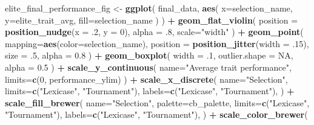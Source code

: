 \documentclass[]{book}
\newenvironment{Shaded}{\begin{snugshade}}{\end{snugshade}}
\newcommand{\DataTypeTok}[1]{\textcolor[rgb]{0.13,0.29,0.53}{#1}}
\newcommand{\DecValTok}[1]{\textcolor[rgb]{0.00,0.00,0.81}{#1}}
\newcommand{\FloatTok}[1]{\textcolor[rgb]{0.00,0.00,0.81}{#1}}
\newcommand{\KeywordTok}[1]{\textcolor[rgb]{0.13,0.29,0.53}{\textbf{#1}}}
\newcommand{\NormalTok}[1]{#1}
\newcommand{\OperatorTok}[1]{\textcolor[rgb]{0.81,0.36,0.00}{\textbf{#1}}}
\newcommand{\OtherTok}[1]{\textcolor[rgb]{0.56,0.35,0.01}{#1}}
\newcommand{\StringTok}[1]{\textcolor[rgb]{0.31,0.60,0.02}{#1}}
\begin{document}
\begin{Shaded}
\begin{Highlighting}[]
\NormalTok{elite_final_performance_fig <-}\StringTok{ }\KeywordTok{ggplot}\NormalTok{(}
\NormalTok{    final_data,}
    \KeywordTok{aes}\NormalTok{(}
      \DataTypeTok{x=}\NormalTok{selection_name,}
      \DataTypeTok{y=}\NormalTok{elite_trait_avg,}
      \DataTypeTok{fill=}\NormalTok{selection_name}
\NormalTok{    )}
\NormalTok{  ) }\OperatorTok{+}
\StringTok{  }\KeywordTok{geom_flat_violin}\NormalTok{(}
    \DataTypeTok{position =} \KeywordTok{position_nudge}\NormalTok{(}\DataTypeTok{x =} \FloatTok{.2}\NormalTok{, }\DataTypeTok{y =} \DecValTok{0}\NormalTok{),}
    \DataTypeTok{alpha =} \FloatTok{.8}\NormalTok{,}
    \DataTypeTok{scale=}\StringTok{"width"}
\NormalTok{  ) }\OperatorTok{+}
\StringTok{  }\KeywordTok{geom_point}\NormalTok{(}
    \DataTypeTok{mapping=}\KeywordTok{aes}\NormalTok{(}\DataTypeTok{color=}\NormalTok{selection_name),}
    \DataTypeTok{position =} \KeywordTok{position_jitter}\NormalTok{(}\DataTypeTok{width =} \FloatTok{.15}\NormalTok{),}
    \DataTypeTok{size =} \FloatTok{.5}\NormalTok{,}
    \DataTypeTok{alpha =} \FloatTok{0.8}
\NormalTok{  ) }\OperatorTok{+}
\StringTok{  }\KeywordTok{geom_boxplot}\NormalTok{(}
    \DataTypeTok{width =} \FloatTok{.1}\NormalTok{,}
    \DataTypeTok{outlier.shape =} \OtherTok{NA}\NormalTok{,}
    \DataTypeTok{alpha =} \FloatTok{0.5}
\NormalTok{  ) }\OperatorTok{+}
\StringTok{  }\KeywordTok{scale_y_continuous}\NormalTok{(}
    \DataTypeTok{name=}\StringTok{"Average trait performance"}\NormalTok{,}
    \DataTypeTok{limits=}\KeywordTok{c}\NormalTok{(}\DecValTok{0}\NormalTok{, performance_ylim)}
\NormalTok{  ) }\OperatorTok{+}
\StringTok{  }\KeywordTok{scale_x_discrete}\NormalTok{(}
    \DataTypeTok{name=}\StringTok{"Selection"}\NormalTok{,}
    \DataTypeTok{limits=}\KeywordTok{c}\NormalTok{(}\StringTok{"Lexicase"}\NormalTok{, }\StringTok{"Tournament"}\NormalTok{),}
    \DataTypeTok{labels=}\KeywordTok{c}\NormalTok{(}\StringTok{"Lexicase"}\NormalTok{, }\StringTok{"Tournament"}\NormalTok{),}
\NormalTok{  ) }\OperatorTok{+}
\StringTok{  }\KeywordTok{scale_fill_brewer}\NormalTok{(}
    \DataTypeTok{name=}\StringTok{"Selection"}\NormalTok{,}
    \DataTypeTok{palette=}\NormalTok{cb_palette,}
    \DataTypeTok{limits=}\KeywordTok{c}\NormalTok{(}\StringTok{"Lexicase"}\NormalTok{, }\StringTok{"Tournament"}\NormalTok{),}
    \DataTypeTok{labels=}\KeywordTok{c}\NormalTok{(}\StringTok{"Lexicase"}\NormalTok{, }\StringTok{"Tournament"}\NormalTok{),}
\NormalTok{  ) }\OperatorTok{+}
\StringTok{  }\KeywordTok{scale_color_brewer}\NormalTok{(}

\end{Highlighting}
\end{Shaded}
\end{document}
